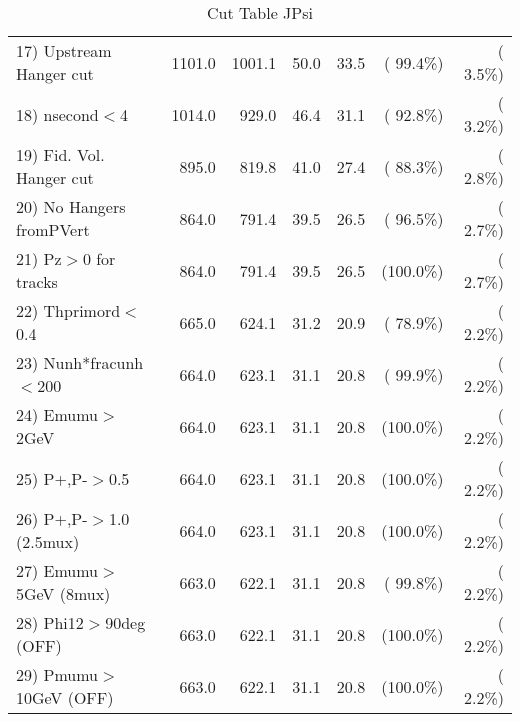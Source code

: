 \begin{table}[h!]
\begin{tabular}{||l||r|r|r|r|r|r||}
 17) Upstream Hanger cut  &       1101.0 &       1001.1 &         50.0 &         33.5 & ( 99.4\%) & (  3.5\%) \\
 18) nsecond$<$4          &       1014.0 &        929.0 &         46.4 &         31.1 & ( 92.8\%) & (  3.2\%) \\
 19) Fid. Vol. Hanger cut &        895.0 &        819.8 &         41.0 &         27.4 & ( 88.3\%) & (  2.8\%) \\
 20) No Hangers fromPVert &        864.0 &        791.4 &         39.5 &         26.5 & ( 96.5\%) & (  2.7\%) \\
 21) Pz$>$0 for tracks    &        864.0 &        791.4 &         39.5 &         26.5 & (100.0\%) & (  2.7\%) \\
 22) Thprimord$<$0.4      &        665.0 &        624.1 &         31.2 &         20.9 & ( 78.9\%) & (  2.2\%) \\
 23) Nunh*fracunh$<$200   &        664.0 &        623.1 &         31.1 &         20.8 & ( 99.9\%) & (  2.2\%) \\
 24) Emumu$>$2GeV         &        664.0 &        623.1 &         31.1 &         20.8 & (100.0\%) & (  2.2\%) \\
 25) P+,P-$>$0.5          &        664.0 &        623.1 &         31.1 &         20.8 & (100.0\%) & (  2.2\%) \\
 26) P+,P-$>$1.0 (2.5mux) &        664.0 &        623.1 &         31.1 &         20.8 & (100.0\%) & (  2.2\%) \\
 27) Emumu$>$5GeV  (8mux) &        663.0 &        622.1 &         31.1 &         20.8 & ( 99.8\%) & (  2.2\%) \\
 28) Phi12$>$90deg  (OFF) &        663.0 &        622.1 &         31.1 &         20.8 & (100.0\%) & (  2.2\%) \\
 29) Pmumu$>$10GeV  (OFF) &        663.0 &        622.1 &         31.1 &         20.8 & (100.0\%) & (  2.2\%) \\
 \hline
 \hline
 \end{tabular}
 \caption{Cut Table  JPsi     }
 \label{tab-cutcohjpsi-mumu_cohrhop}
 \end{table}
